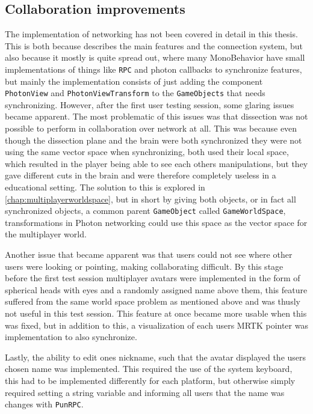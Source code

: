 \subsection{Collaboration improvements}

The implementation of networking has not been covered in detail in this thesis. This is both because  describes the main features and the connection system, but also because it mostly is quite spread out, where many MonoBehavior have small implementations of things like \texttt{RPC} and photon callbacks to synchronize features, but mainly the implementation consists of just adding the component \texttt{PhotonView} and \texttt{PhotonViewTransform} to the \texttt{GameObjects} that needs synchronizing. 
However, after the first user testing session, some glaring issues became apparent. The most problematic of this issues was that dissection was not possible to perform in collaboration over network at all. This was because even though the dissection plane and the brain were both synchronized they were not using the same vector space when synchronizing, both used their local space, which resulted in the player being able to see each others manipulations, but they gave different cuts in the brain and were therefore completely useless in a educational setting. The solution to this is explored in \autoref{chap:multiplayerworldspace}, but in short by giving both objects, or in fact all synchronized objects, a common parent \texttt{GameObject} called \texttt{GameWorldSpace}, transformations in Photon networking could use this space as the vector space for the multiplayer world. 


Another issue that became apparent was that users could not see where other users were looking or pointing, making collaborating difficult. By this stage before the first test session multiplayer avatars were implemented in the form of spherical heads with eyes and a randomly assigned name above them, this feature suffered from the same world space problem as mentioned above and was thusly not useful in this test session. This feature at once became more usable when this was fixed, but in addition to this, a visualization of each users MRTK pointer was implementation to also synchronize. 

Lastly, the ability to edit ones nickname, such that the avatar displayed the users chosen name was implemented. This required the use of the system keyboard, this had to be implemented differently for each platform, but otherwise simply required setting a string variable and informing all users that the name was changes with \texttt{PunRPC}.

